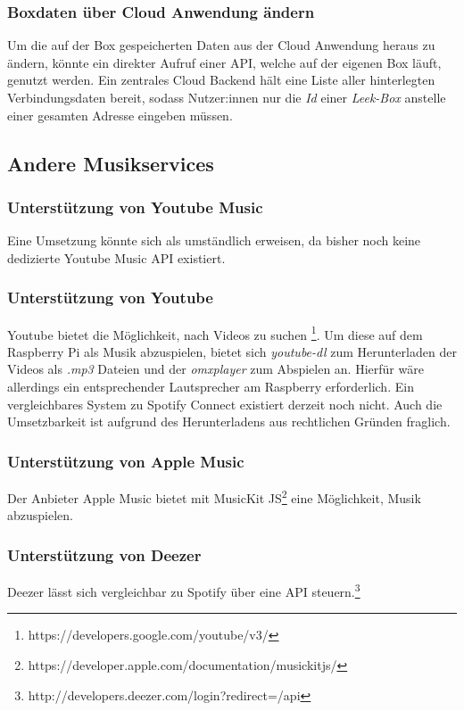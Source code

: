 \documentclass[10pt, a4paper]{article}
\begin{document}
\begin{onehalfspace}
\subsubsection*{Boxdaten über Cloud Anwendung ändern}
Um die auf der Box gespeicherten Daten aus der Cloud Anwendung heraus zu ändern, könnte ein direkter Aufruf einer API, welche auf der eigenen Box läuft, genutzt werden.
Ein zentrales Cloud Backend hält eine Liste aller hinterlegten Verbindungsdaten bereit, sodass Nutzer:innen nur die \textit{Id} einer \textit{Leek-Box} anstelle einer gesamten Adresse eingeben müssen.

\subsection{Andere Musikservices}
\subsubsection*{Unterstützung von Youtube Music}
Eine Umsetzung könnte sich als umständlich erweisen, da bisher noch keine dedizierte Youtube Music API existiert.

\subsubsection*{Unterstützung von Youtube}
Youtube bietet die Möglichkeit, nach Videos zu suchen \footnote{https://developers.google.com/youtube/v3/}. Um diese auf dem Raspberry Pi als Musik abzuspielen, bietet sich \textit{youtube-dl} zum Herunterladen der Videos als \textit{.mp3} Dateien und der \textit{omxplayer} zum Abspielen an.
Hierfür wäre allerdings ein entsprechender Lautsprecher am Raspberry erforderlich.
Ein vergleichbares System zu Spotify Connect existiert derzeit noch nicht.
Auch die Umsetzbarkeit ist aufgrund des Herunterladens aus rechtlichen Gründen fraglich.

\subsubsection*{Unterstützung von Apple Music}
Der Anbieter Apple Music bietet mit MusicKit JS\footnote{https://developer.apple.com/documentation/musickitjs/} eine Möglichkeit, Musik abzuspielen.

\subsubsection*{Unterstützung von Deezer}
Deezer lässt sich vergleichbar zu Spotify über eine API steuern.\footnote{http://developers.deezer.com/login?redirect=/api}


\end{onehalfspace}
\end{document}
